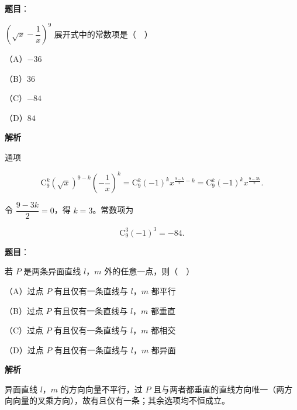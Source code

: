 \begin{answer}

\textbf{题目}：

$\left(\sqrt x-\dfrac1x\right)^9$ 展开式中的常数项是（　）

（A）$-36$

（B）$36$

（C）$-84$

（D）$84$

\textbf{解析}

通项

\nopagebreak[4]
\[\mathrm C_9^k(\sqrt x)^{9-k}\left(-\frac1x\right)^k
=\mathrm C_9^k(-1)^k x^{\frac{9-k}{2}-k}
=\mathrm C_9^k(-1)^k x^{\frac{9-3k}{2}}.\]

令 $\dfrac{9-3k}{2}=0$，得 $k=3$。常数项为

\nopagebreak[4]
\[\mathrm C_9^3(-1)^3=-84.\]


\end{answer}
\begin{answer}

\textbf{题目}：

若 $P$ 是两条异面直线 $l$，$m$ 外的任意一点，则（　）

（A）过点 $P$ 有且仅有一条直线与 $l$，$m$ 都平行

（B）过点 $P$ 有且仅有一条直线与 $l$，$m$ 都垂直

（C）过点 $P$ 有且仅有一条直线与 $l$，$m$ 都相交

（D）过点 $P$ 有且仅有一条直线与 $l$，$m$ 都异面

\textbf{解析}

异面直线 $l$，$m$ 的方向向量不平行，过 $P$ 且与两者都垂直的直线方向唯一（两方向向量的叉乘方向），故有且仅有一条；其余选项均不恒成立。


\end{answer}
